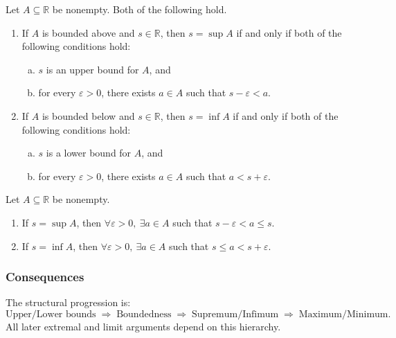 \begin{proposition}
\label{prop:eps-char}
Let $A \subseteq \mathbb{R}$ be nonempty. Both of the following hold.
\begin{enumerate}
  \item If $A$ is bounded above and $s \in \mathbb{R}$, then $s = \sup A$
        if and only if both of the following conditions hold:
        \begin{enumerate}[(a)]
          \item $s$ is an upper bound for $A$, and
          \item for every $\varepsilon > 0$, there exists $a \in A$ such that
                $s - \varepsilon < a$.
        \end{enumerate}
  \item If $A$ is bounded below and $s \in \mathbb{R}$, then $s = \inf A$
        if and only if both of the following conditions hold:
        \begin{enumerate}[(a)]
          \item $s$ is a lower bound for $A$, and
          \item for every $\varepsilon > 0$, there exists $a \in A$ such that
                $a < s + \varepsilon$.
        \end{enumerate}
\end{enumerate}
\end{proposition}

\begin{corollary}
\label{cor:eps-approx}
Let $A \subseteq \mathbb{R}$ be nonempty.
\begin{enumerate}
  \item If $s = \sup A$, then
        $\forall \varepsilon > 0,\ \exists a \in A$ such that
        $s - \varepsilon < a \le s$.
  \item If $s = \inf A$, then
        $\forall \varepsilon > 0,\ \exists a \in A$ such that
        $s \le a < s + \varepsilon$.
\end{enumerate}
\end{corollary}

\subsubsection{Consequences}

\begin{remark*}
The structural progression is:
\[
\text{Upper/Lower bounds}
\;\Rightarrow\;
\text{Boundedness}
\;\Rightarrow\;
\text{Supremum/Infimum}
\;\Rightarrow\;
\text{Maximum/Minimum}.
\]
All later extremal and limit arguments depend on this hierarchy.
\end{remark*}